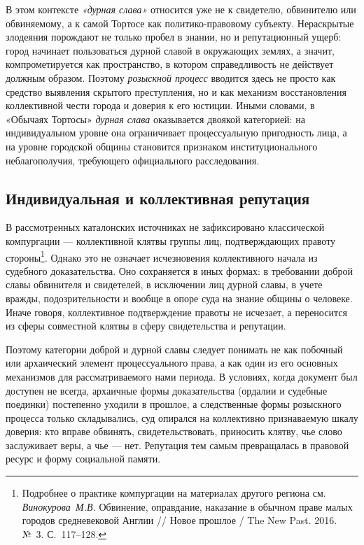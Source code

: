 В этом контексте \emph{«дурная слава» }относится уже не к свидетелю, обвинителю или обвиняемому, а к самой Тортосе как политико-правовому субъекту. Нераскрытые злодеяния порождают не только пробел в знании, но и репутационный ущерб: город начинает пользоваться дурной славой в окружающих землях, а значит, компрометируется как пространство, в котором справедливость не действует должным образом. Поэтому \emph{розыскной процесс }вводится здесь не просто как средство выявления скрытого преступления, но и как механизм восстановления коллективной чести города и доверия к его юстиции. Иными словами, в «Обычаях Тортосы» \emph{дурная слава} оказывается двоякой категорией: на индивидуальном уровне она ограничивает процессуальную пригодность лица, а на уровне городской общины становится признаком институционального неблагополучия, требующего официального расследования.

\subsection{Индивидуальная и коллективная репутация}

В рассмотренных каталонских источниках не зафиксировано классической компургации --- коллективной клятвы группы лиц, подтверждающих правоту стороны\footnote{Подробнее о практике компургации на материалах другого региона см. \emph{Винокурова}\emph{~}\emph{М.В.} Обвинение, оправдание, наказание в обычном праве малых городов средневековой Англии // Новое прошлое / The New Past. 2016. №~3. С.~117--128.}. Однако это не означает исчезновения коллективного начала из судебного доказательства. Оно сохраняется в иных формах: в требовании доброй славы обвинителя и свидетелей, в исключении лиц дурной славы, в учете вражды, подозрительности и вообще в опоре суда на знание общины о человеке. Иначе говоря, коллективное подтверждение правоты не исчезает, а переносится из сферы совместной клятвы в сферу свидетельства и репутации.

Поэтому категории доброй и дурной славы следует понимать не как побочный или архаический элемент процессуального права, а как один из его основных механизмов для рассматриваемого нами периода. В условиях, когда документ был доступен не всегда, архаичные формы доказательства (ордалии и судебные поединки) постепенно уходили в прошлое, а следственные формы розыскного процесса только складывались, суд опирался на коллективно признаваемую шкалу доверия: кто вправе обвинять, свидетельствовать, приносить клятву, чье слово заслуживает веры, а чье --- нет. Репутация тем самым превращалась в правовой ресурс и форму социальной памяти.

